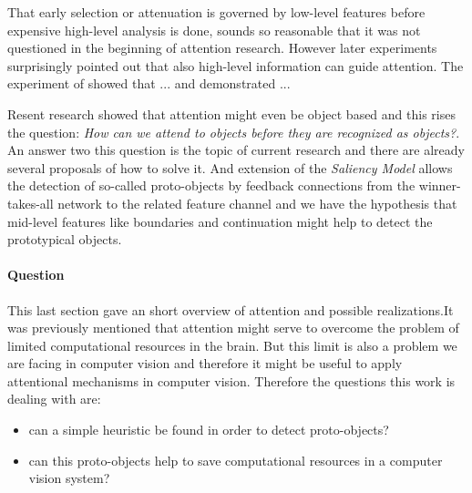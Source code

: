 That early selection or attenuation is governed by low-level features before expensive high-level analysis is done, sounds so reasonable that it was not questioned in the beginning of attention research. However later experiments surprisingly pointed out that also high-level information can guide attention. The experiment of \cite{Potter:1975dr} showed that ...
and \cite{Biederman:1982um} demonstrated ...

Resent research \cite{Einhauser:2008cv} showed that attention might even be object based and this rises the question: \emph{How can we attend to objects before they are recognized as objects?}. An answer two this question is the topic of current research and there are already several proposals of how to solve it. And extension of the \emph{Saliency Model} \cite{Walther:2006tg} allows the detection of so-called proto-objects by feedback connections from the winner-takes-all network to the related feature channel and we have the hypothesis that mid-level features like boundaries and continuation might help to detect the prototypical objects.


\paragraph{Question} %
\label{par:question}
This last section gave an short overview of attention and possible realizations.It was previously mentioned that attention might serve to overcome the problem of limited computational resources in the brain. But this limit is also a problem we are facing in computer vision and therefore it might be useful to apply attentional mechanisms in computer vision. Therefore the questions this work is dealing with are:

\begin{itemize}
    \item can a simple heuristic be found in order to detect proto-objects?
    \item can this proto-objects help to save computational resources in a computer vision system?
\end{itemize}


